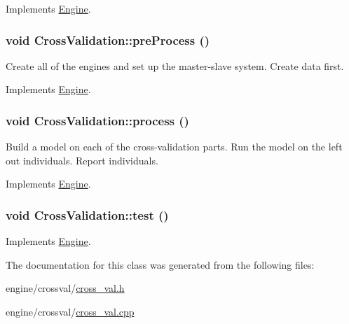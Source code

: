 Implements \hyperlink{classEngine_aaa054d596fb8ced6e3eb4bee208f8c3d}{Engine}.

\hypertarget{classCrossValidation_ad45dad478f034a39696660d7c93b34fa}{
\subsubsection[{preProcess}]{\setlength{\rightskip}{0pt plus 5cm}void CrossValidation::preProcess ()}}
\label{classCrossValidation_ad45dad478f034a39696660d7c93b34fa}
Create all of the engines and set up the master-\/slave system. Create data first. 

Implements \hyperlink{classEngine_aec7076b8979a13c96eceb362437dc68c}{Engine}.

\hypertarget{classCrossValidation_a3435a227d91e03af7d1df7e2c6c4fce9}{
\subsubsection[{process}]{\setlength{\rightskip}{0pt plus 5cm}void CrossValidation::process ()}}
\label{classCrossValidation_a3435a227d91e03af7d1df7e2c6c4fce9}
Build a model on each of the cross-\/validation parts. Run the model on the left out individuals. Report individuals. 

Implements \hyperlink{classEngine_a005f8e277c3dea16ea05803fba223db7}{Engine}.

\hypertarget{classCrossValidation_a1b4664d9123d676b778ff0e89379a1ba}{
\subsubsection[{test}]{\setlength{\rightskip}{0pt plus 5cm}void CrossValidation::test ()}}
\label{classCrossValidation_a1b4664d9123d676b778ff0e89379a1ba}


Implements \hyperlink{classEngine_a2927c4a4263809453063ad482c6434a4}{Engine}.



The documentation for this class was generated from the following files:\begin{DoxyCompactItemize}
\item 
engine/crossval/\hyperlink{cross__val_8h}{cross\_\-val.h}\item 
engine/crossval/\hyperlink{cross__val_8cpp}{cross\_\-val.cpp}\end{DoxyCompactItemize}
